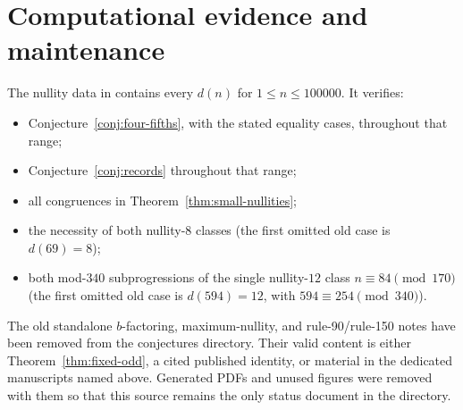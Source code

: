 \documentclass[a4paper]{article}
\begin{document}
\section{Computational evidence and maintenance}

The nullity data in  contains every
$d(n)$ for $1\leq n\leq100000$.  It verifies:
\begin{itemize}
	\item Conjecture~\ref{conj:four-fifths}, with the stated equality cases,
	      throughout that range;
	\item Conjecture~\ref{conj:records} throughout that range;
	\item all congruences in Theorem~\ref{thm:small-nullities};
	\item the necessity of both nullity-$8$ classes (the first omitted old
	      case is $d(69)=8$);
	\item both mod-$340$ subprogressions of the single nullity-$12$ class
	      $n\equiv84\pmod{170}$ (the first omitted old case is
	      $d(594)=12$, with $594\equiv254\pmod{340}$).
\end{itemize}

The old standalone $b$-factoring, maximum-nullity, and rule-90/rule-150
notes have been removed from the conjectures directory.  Their valid
content is either Theorem~\ref{thm:fixed-odd}, a cited published identity,
or material in the dedicated manuscripts named above.  Generated PDFs and
unused figures were removed with them so that this source remains the only
status document in the directory.



\end{document}
